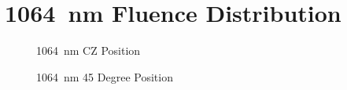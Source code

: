 \documentclass[journal,twoside,web]{ieeecolor}
\begin{document}
\section{1064~nm Fluence Distribution}
\label{app:1064Simulations}
\begin{figure}[htb!]
    \caption{\label{fig:1064-CZ} 1064~nm CZ Position}
\end{figure}

\begin{figure}[htb!]
    \caption{\label{fig:1064-45} 1064~nm 45 Degree Position}
\end{figure}
\end{document}
